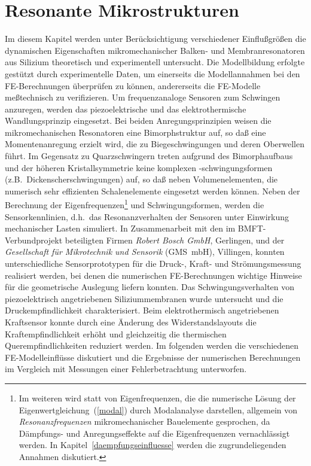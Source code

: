 \chapter{Resonante Mikrostrukturen}
\label{schwingungsverhalten}

Im diesem Kapitel werden unter Berücksichtigung verschiedener
Einflußgrößen die dynamischen Eigenschaften mikromechanischer
Balken- und Membranresonatoren aus Silizium
theoretisch und experimentell untersucht. Die Modellbildung
erfolgte gestützt durch experimentelle Daten, um einerseits die
Modellannahmen bei den FE-Berechnungen überprüfen zu können,
andererseits die FE-Modelle meßtechnisch zu verifizieren.
Um fre\-quenzanaloge Sensoren zum Schwingen anzuregen, werden das
piezoelektrische und das elektrothermische Wandlungsprinzip eingesetzt.
Bei beiden Anregungsprinzipien weisen die mikromechanischen
Resonatoren eine Bimorphstruktur auf, so daß eine Momentenanregung erzielt
wird, die zu Biegeschwingungen und deren Oberwellen führt. Im Gegensatz
zu Quarzschwingern treten aufgrund des Bimorphaufbaus und der höheren
Kristallsymmetrie keine komplexen -schwingungsformen
(z.B.\ Dickenscherschwingungen) auf, so daß neben Volumenelementen,
die numerisch sehr effizienten Schalenelemente eingesetzt werden können.
Neben der Berechnung der Eigenfrequenzen\footnote{Im weiteren wird statt
von Eigenfrequenzen, die die numerische Lösung der
Eigenwertgleichung~(\ref{modal}) durch Modalanalyse darstellen, allgemein
von {\em Resonanzfrequenzen} mikromechanischer Bauelemente gesprochen, da
Dämpfungs- und Anregungseffekte auf die Eigenfrequenzen vernachlässigt
werden. In Kapitel~\ref{daempfungseinfluesse} werden die zugrundeliegenden
Annahmen diskutiert.}
und Schwingungsformen, werden die
Sensorkennlinien, d.h.\ das Resonanzverhalten der Sensoren unter Einwirkung
mechanischer Lasten simuliert. In Zusammenarbeit mit den
im BMFT-Verbundprojekt beteiligten Firmen {\em Robert Bosch GmbH},
Gerlingen, und der {\em Gesellschaft für Mikrotechnik und Sensorik}
(GMS~mbH), Villingen, konnten unterschiedliche
Sensorprototypen für die Druck-, Kraft- und Strömungsmessung
realisiert werden, bei denen die numerischen FE-Berechnungen
wichtige Hinweise für die geometrische Auslegung liefern konnten.
Das Schwingungsverhalten von piezoelektrisch angetriebenen Siliziummembranen
wurde untersucht und die Druckempfindlichkeit charakterisiert.
Beim elektrothermisch angetriebenen Kraftsensor konnte durch eine
Änderung des Widerstandslayouts die Kraftempfindlichkeit erhöht und
gleichzeitig die thermischen Querempfindlichkeiten reduziert werden.
Im folgenden werden die verschiedenen FE-Modelleinflüsse diskutiert
und die Ergebnisse der numerischen Berechnungen im Vergleich mit
Messungen einer Fehlerbetrachtung unterworfen.


